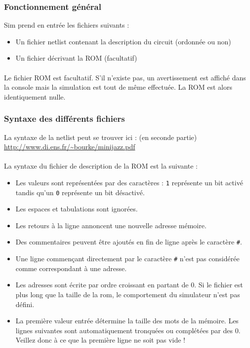 \documentclass{article}
\begin{document}
\subsubsection{Fonctionnement général}
Sim prend en entrée les fichiers suivants :
\begin{itemize}
	\item Un fichier netlist contenant la description du circuit (ordonnée ou non)
	\item Un fichier décrivant la ROM (facultatif)
\end{itemize}

\paragraph{}Le fichier ROM est facultatif. S'il n'existe pas, un avertissement est affiché dans la console mais la simulation est tout de même effectuée. La ROM est alors identiquement nulle.


\subsubsection{Syntaxe des différents fichiers}
La syntaxe de la netlist peut se trouver ici : (en seconde partie)\\
\url{http://www.di.ens.fr/~bourke/minijazz.pdf}

\paragraph{}La syntaxe du fichier de description de la ROM est la suivante :
\begin{itemize}
	\item Les valeurs sont représentées par des caractères : \texttt1 représente un bit activé tandis qu'un \texttt0 représente un bit désactivé.
	\item Les espaces et tabulations sont ignorées.
	\item Les retours à la ligne annoncent une nouvelle adresse mémoire.
	\item Des commentaires peuvent être ajoutés en fin de ligne après le caractère \texttt\#.
	\item Une ligne commençant directement par le caractère \texttt\# n'est pas considérée comme correspondant à une adresse.
	\item Les adresses sont écrite par ordre croissant en partant de 0. Si le fichier est plus long que la taille de la rom, le comportement du simulateur n'est pas défini.
	\item La première valeur entrée détermine la taille des mots de la mémoire. Les lignes suivantes sont automatiquement tronquées ou complétées par des 0. Veillez donc à ce que la première ligne ne soit pas vide !
\end{itemize}
\end{document}

